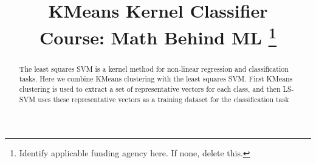 \documentclass[conference]{IEEEtran}
\begin{document}
    \title{KMeans Kernel Classifier\\
    {\footnotesize \textsuperscript {}Course: Math Behind ML }
    \thanks{Identify applicable funding agency here. If none, delete this.}
    }

    \author{
    \and
    }

    \maketitle

    \begin{abstract}
        The least squares SVM is a kernel method for non-linear regression and classification tasks. Here we combine KMeans clustering with the least squares SVM. First KMeans clustering is used to extract a set of representative vectors for each class, and then LS-SVM uses these representative vectors as a training dataset for the classification task
    \end{abstract}
\end{document}
